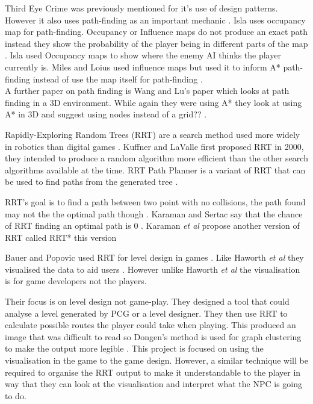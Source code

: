 \documentclass[journal]{IEEEtran}
\begin{document}
Third Eye Crime was previously mentioned for it's use of design patterns. However it also uses path-finding as an important mechanic \cite{Isla2014}. Isla uses occupancy map for path-finding. Occupancy or Influence maps do not produce an exact path instead they show the probability of the player being in different parts of the map \cite{Isla2014, Miles2006}. Isla used Occupancy maps to show where the enemy AI thinks the player currently is. Miles and Loius used influence maps but used it to inform A* path-finding instead of use the map itself for path-finding \cite{Miles2006}.\\
 
A further paper on path finding is Wang and Lu's paper which looks at path finding in a 3D environment. While again they were using A* they look at using A* in 3D and suggest using nodes instead of a grid?? \cite{wang2012}.

Rapidly-Exploring Random Trees (RRT) are a search method used more widely in robotics than digital games \cite{Kuffner2000}. Kuffner and LaValle first proposed RRT in 2000, they intended to produce a random algorithm more efficient than the other search algorithms available at the time. RRT Path Planner is a variant of RRT that can be used to find paths from the generated tree \cite{Kuffner2000}.

RRT's goal is to find a path between two point with no collisions, the path found may not the the optimal path though \cite{Kuffner2000, Karaman2011}.  Karaman and Sertac say that the chance of RRT finding an optimal path is 0 \cite{karaman2010}.  Karaman \textit{et al} propose another version of RRT called RRT* this version 

Bauer and Popovic used RRT for level design in games  \cite{bauer2012}. Like Haworth \textit{et al} they visualised the data to aid users \cite{bauer2012, Haworth2010}. However unlike Haworth \textit{et al} the visualisation is for game developers not the players. 

Their focus is on level design not game-play. They designed a tool that could analyse a level generated by PCG or a level designer. They then use RRT to calculate possible routes the player could take when playing. This produced an image that was difficult to read so Dongen's method is used for graph clustering to make the output more legible \cite{bauer2012, van2001}.  This project is focused on using the visualisation in the game to the game design. However, a similar technique will be required to organise the RRT output to make it understandable to the player in way that they can look at the visualisation and interpret what the NPC is going to do. 
\end{document}
